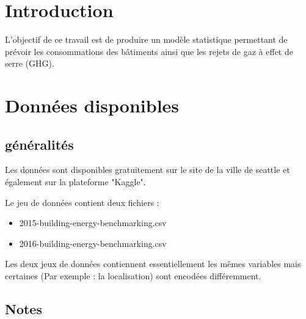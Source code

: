 
\section{Introduction}

L'objectif de ce travail est de produire un modèle statistique permettant de prévoir
les consommations des bâtiments ainsi que les rejets de gaz à effet de serre (GHG).



\section{Données disponibles}

\subsection{généralités}

Les données sont disponibles gratuitement sur le site de la ville de seattle et
également sur la plateforme "Kaggle".

Le jeu de données contient deux fichiers :
\begin{itemize}
  \item{2015-building-energy-benchmarking.csv}
  \item{2016-building-energy-benchmarking.csv}
\end{itemize}

Les deux jeux de données contiennent essentiellement les mêmes variables mais
certaines (Par exemple : la localisation) sont encodées différemment.

\subsection{Notes}

